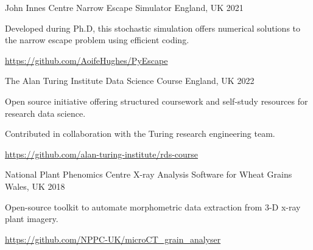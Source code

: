 \begin{cventries}
  \cventry
    {John Innes Centre} %
    {Narrow Escape Simulator} %
    {England, UK} %
    {2021} %
    {
      \begin{cvitems}
        \item {Developed during Ph.D, this stochastic simulation offers numerical solutions to the narrow escape problem using efficient coding.}
        \item {\url{https://github.com/AoifeHughes/PyEscape}}
      \end{cvitems}
    }

  \cventry
    {The Alan Turing Institute} %
    {Data Science Course} %
    {England, UK} %
    {2022} %
    {
      \begin{cvitems}
        \item {Open source initiative offering structured coursework and self-study resources for research data science.}
        \item {Contributed in collaboration with the Turing research engineering team.}
        \item {\url{https://github.com/alan-turing-institute/rds-course}}
      \end{cvitems}
    }

  \cventry
    {National Plant Phenomics Centre} %
    {X-ray Analysis Software for Wheat Grains} %
    {Wales, UK} %
    {2018} %
    {
      \begin{cvitems}
        \item {Open-source toolkit to automate morphometric data extraction from 3-D x-ray plant imagery.}
        \item {\url{https://github.com/NPPC-UK/microCT_grain_analyser}}
      \end{cvitems}
    }

\end{cventries}
